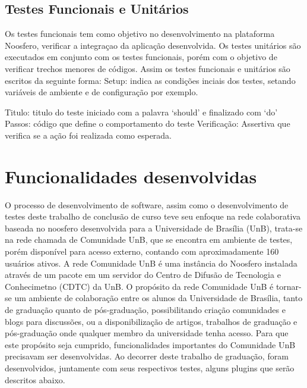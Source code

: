 \subsection{Testes Funcionais e Unitários}
%
Os testes funcionais tem como objetivo no desenvolvimento na plataforma Noosfero, verificar
a integraçao da aplicação desenvolvida.
%
Os testes unitários são executados em conjunto com os testes funcionais, porém  com o objetivo
de verificar trechos menores de códigos.
%
Assim os testes funcionais e unitários são escritos da seguinte forma:
%
Setup: indica as condições inciais dos testes, setando variáveis de ambiente e de 
configuração por exemplo.

Titulo: titulo do teste iniciado com a palavra ‘should’ e finalizado com ‘do’
%
Passos: código que define o comportamento do teste
%
Verificação: Assertiva que verifica se a ação foi realizada como esperada.
%

\section{Funcionalidades desenvolvidas}
O processo de desenvolvimento de software, assim como o desenvolvimento de testes 
deste trabalho de conclusão de curso teve seu enfoque na rede colaborativa baseada 
no noosfero desenvolvida para a Universidade de Brasília (UnB), trata-se na rede 
chamada de Comunidade UnB, que se encontra em ambiente de testes, porém disponível 
para acesso externo, contando com aproximadamente 160 usuários ativos. A rede 
Comunidade UnB é uma instância do Noosfero instalada através de um pacote em um 
servidor do Centro de Difusão de Tecnologia e Conhecimetno (CDTC) da UnB.
%
O propósito da rede Comunidade UnB é tornar-se um ambiente de colaboração entre os 
alunos da Universidade de Brasília, tanto de graduação quanto de pós-graduação, 
possibilitando criação comunidades e blogs para discussões, ou a disponibilização 
de artigos, trabalhos de graduação e pós-graduação onde qualquer membro da universidade 
tenha acesso.
%
Para que este propósito seja cumprido, funcionalidades importantes do Comunidade 
UnB precisavam ser desenvolvidas. Ao decorrer deste trabalho de graduação, foram 
desenvolvidos, juntamente com seus respectivos testes, alguns plugins que serão 
descritos abaixo.
